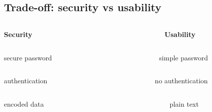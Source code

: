\subsection{Trade-off: security vs usability}
\begin{frame}
\begin{Large}
\begin{columns}
\begin{column}{0.4\linewidth}
\flushright\Huge\bfseries Security
\end{column}
\begin{column}{0.2\linewidth}
\end{column}
\begin{column}{0.4\linewidth}
\flushleft\Huge\bfseries Usability
\end{column}
\end{columns}
\pause
\begin{columns}
\begin{column}{0.4\linewidth}
\flushright secure password
\end{column}
\begin{column}{0.2\linewidth}
\end{column}
\begin{column}{0.4\linewidth}
\flushleft simple password
\end{column}
\end{columns}
\pause
\begin{columns}
\begin{column}{0.4\linewidth}
\flushright authentication
\end{column}
\begin{column}{0.2\linewidth}
\end{column}
\begin{column}{0.4\linewidth}
\flushleft no authentication
\end{column}
\end{columns}
\pause
\begin{columns}
\begin{column}{0.4\linewidth}
\flushright encoded data
\end{column}
\begin{column}{0.2\linewidth}
\end{column}
\begin{column}{0.4\linewidth}
\flushleft plain text
\end{column}
\end{columns}
\end{Large}
\end{frame}


